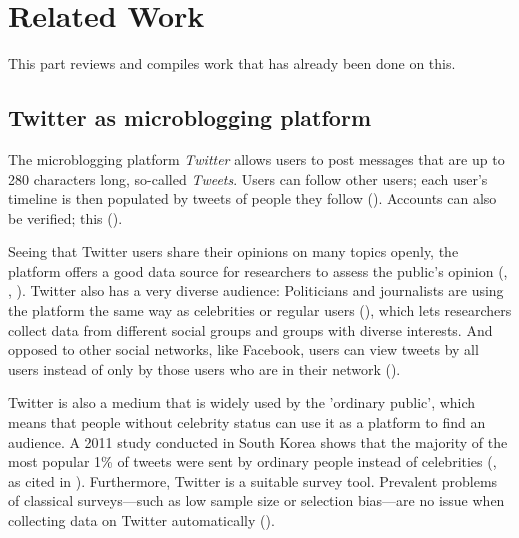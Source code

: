 \section{Related Work}
This part reviews and compiles work that has already been done on this.

\subsection{Twitter as microblogging platform}
The microblogging platform \emph{Twitter} allows users to post messages that are up to 280 characters long, so-called \emph{Tweets}. Users can follow other users; each user's timeline is then populated by tweets of people they follow (\cite{thimm2012}). Accounts can also be verified; this  (\cite{twitterinc.}). 

Seeing that Twitter users share their opinions on many topics openly, the platform offers a good data source for researchers to assess the public's opinion (\cite{pak2010twitter}, \cite{pfaffenberger2016twitter}, \cite{broniatowski2014twitter}). Twitter also has a very diverse audience: Politicians and journalists are using the platform the same way as celebrities or regular users (\cite{pak2010twitter}), which lets researchers collect data from different social groups and groups with diverse interests. And opposed to other social networks, like Facebook, users can view tweets by all users instead of only by those users who are in their network (\cite{park2013}).

Twitter is also a medium that is widely used by the 'ordinary public', which means that people without celebrity status can use it as a platform to find an audience. A 2011 study conducted in South Korea shows that the majority of the most popular 1\% of tweets were sent by ordinary people instead of celebrities (\cite{chang2011structure}, as cited in \cite{park2013}). Furthermore, Twitter is a suitable survey tool. Prevalent problems of classical surveys---such as low sample size or selection bias---are no issue when collecting data on Twitter automatically (\cite{takabe2016}). 

